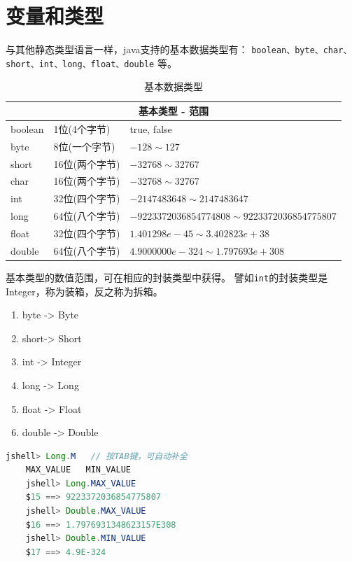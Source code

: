 \section{变量和类型}
与其他静态类型语言一样，java支持的基本数据类型有：
\lstinline{boolean、byte、char、short、int、long、float、double}
等。

\begin{table}[!htbp] \centering \small
	\caption{基本数据类型}
\begin{tabular}{|p{1.5cm}|p{3cm}|p{8.5cm}|}
\toprule
	\multicolumn{3}{|c|}{基本类型 - 范围}\\
\midrule
  boolean&1位(4个字节)\footnotemark&true, false \\
	byte&8位(一个字节)&$-128\sim127$\\
	short&16位(两个字节)&$-32768\sim32767$\\
	char&16位(两个字节)&$-32768\sim32767$\\
	int&32位(四个字节)&$-2147483648\sim2147483647$\\
	long&64位(八个字节)&$-9223372036854774808\sim9223372036854775807$\\
	float&32位(四个字节)&$1.401298e-45\sim3.402823e+38$\\
	double&64位(八个字节)&$4.9000000e-324\sim1.797693e+308$\\
\bottomrule
\end{tabular}
\end{table}


基本类型的数值范围，可在相应的封装类型中获得。
譬如\lstinline{int}的封装类型是Integer，称为装箱，反之称为拆箱。
\begin{enumerate}
	\item byte -> Byte
	\item short-> Short
	\item int -> Integer
	\item long -> Long
	\item float -> Float
	\item double -> Double
\end{enumerate}

\begin{lstlisting}[language=Java, backgroundcolor=\color{lightgray!10}]
	jshell> Long.M   // 按TAB键，可自动补全
	MAX_VALUE   MIN_VALUE   
	jshell> Long.MAX_VALUE
	$15 ==> 9223372036854775807
	jshell> Double.MAX_VALUE
	$16 ==> 1.7976931348623157E308
	jshell> Double.MIN_VALUE
	$17 ==> 4.9E-324
\end{lstlisting}

